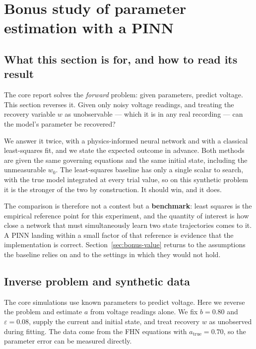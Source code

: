 \section{Bonus study of parameter estimation with a PINN}
\label{sec:bonus}

\subsection{What this section is for, and how to read its result}
\label{sec:bonus-frame}

The core report solves the \emph{forward} problem: given parameters, predict voltage. This section
reverses it. Given only noisy voltage readings, and treating the recovery variable \(w\) as
unobservable --- which it is in any real recording --- can the model's parameter be recovered?

We answer it twice, with a physics-informed neural network and with a classical least-squares fit,
and we state the expected outcome in advance. Both methods are given the same governing equations
and the same initial state, including the unmeasurable \(w_0\). The least-squares baseline has only
a single scalar to search, with the true model integrated at every trial value, so on this
synthetic problem it is the stronger of the two by construction. It should win, and it does.

The comparison is therefore not a contest but a \textbf{benchmark}: least squares is the empirical
reference point for this experiment, and the quantity of interest is how close a network that must
simultaneously learn two state trajectories comes to it. A PINN landing within a small factor of
that reference is evidence that the implementation is correct. Section~\ref{sec:bonus-value}
returns to the assumptions the baseline relies on and to the settings in which they would not hold.

\subsection{Inverse problem and synthetic data}

The core simulations use known parameters to predict voltage. Here we reverse the problem and estimate \(a\) from voltage readings alone. We fix \(b=0.80\) and \(\varepsilon=0.08\), supply the current and initial state, and treat recovery \(w\) as unobserved during fitting. The data come from the FHN equations with \(a_{\mathrm{true}}=0.70\), so the parameter error can be measured directly.

